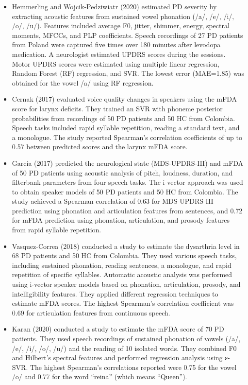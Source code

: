 \begin{itemize}
    \item Hemmerling and Wojcik-Pedziwiatr (2020) estimated PD severity by extracting acoustic features from sustained vowel phonation (/a/, /e/, /i/, /o/, /u/). Features included average F0, jitter, shimmer, energy, spectral moments, MFCCs, and PLP coefficients. Speech recordings of 27 PD patients from Poland were captured five times over 180 minutes after levodopa medication. A neurologist estimated UPDRS scores during the sessions. Motor UPDRS scores were estimated using multiple linear regression, Random Forest (RF) regression, and SVR. The lowest error (MAE=1.85) was obtained for the vowel /a/ using RF regression.
    \item Cernak (2017) evaluated voice quality changes in speakers using the mFDA score for larynx deficits. They trained an SVR with phoneme posterior probabilities from recordings of 50 PD patients and 50 HC from Colombia. Speech tasks included rapid syllable repetition, reading a standard text, and a monologue. The study reported Spearman’s correlation coefficients of up to 0.57 between predicted scores and the larynx mFDA score.
    \item García (2017) predicted the neurological state (MDS-UPDRS-III) and mFDA of 50 PD patients using acoustic analysis of pitch, loudness, duration, and filterbank parameters from four speech tasks. The i-vector approach was used to obtain speaker models of 50 PD patients and 50 HC from Colombia. The study achieved a Spearman correlation of 0.63 for MDS-UPDRS-III prediction using phonation and articulation features from sentences, and 0.72 for mFDA prediction using phonation, articulation, and prosody features from rapid syllable repetition.
    \item Vasquez-Correa (2018) conducted a study to estimate the dysarthria level in 68 PD patients and 50 HC from Colombia. They used various speech tasks, including sustained phonation, reading sentences, a monologue, and rapid repetition of specific syllables. Automatic acoustic analysis was performed using i-vector speaker models based on phonation, articulation, prosody, and intelligibility features. They applied different regression techniques to estimate mFDA scores. The highest Spearman’s correlation coefficient was 0.69 for articulation features from continuous speech.
    \item Karan (2020) conducted a study to estimate the mFDA score of 70 PD patients. They used speech recordings of sustained phonation of vowels (/a/, /e/, /i/, /o/, /u/) and the reading of 10 isolated words. They combined F0 and Hilbert’s spectral features and performed regression analysis using ε-SVR. The highest Spearman’s correlations reported were 0.75 for the vowel /o/ and 0.77 for the word “reina” (which means “Queen”).
\end{itemize}

